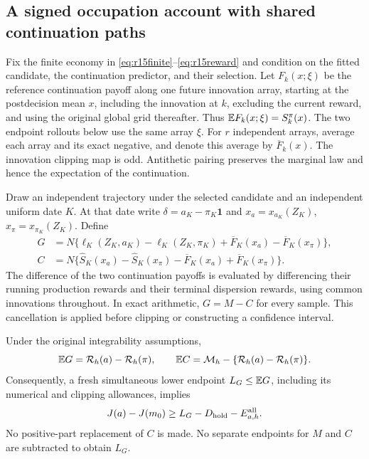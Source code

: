 \subsection{A signed occupation account with shared continuation paths}
\label{sec:r16signedbridge}

Fix the finite economy in \eqref{eq:r15finite}--\eqref{eq:r15reward} and
condition on the fitted candidate, the continuation predictor, and their
selection. Let $F_k(x;\xi)$ be the reference continuation payoff along one
future innovation array, starting at the postdecision mean $x$, including
the innovation at $k$, excluding the current reward, and using the original
global grid thereafter. Thus $\mathbb E F_k(x;\xi)=S_k^\pi(x)$. The two endpoint
rollouts below use the same array $\xi$. For $r$ independent arrays, average
each array and its exact negative, and denote this average by
$\overline F_k(x)$. The innovation clipping map is odd. Antithetic pairing
preserves the marginal law and hence the expectation of the continuation.

Draw an independent trajectory under the selected candidate and an independent
uniform date $K$. At that date write $\delta=a_K-\pi_K\bm1$ and
$x_a=x_{a_K}(Z_K)$, $x_\pi=x_{\pi_K}(Z_K)$. Define
\begin{align}
 G&=N\{\ell_K(Z_K,a_K)-\ell_K(Z_K,\pi_K)
                 +\overline F_K(x_a)-\overline F_K(x_\pi)\},\label{eq:r16signedG}\\
 C&=N\{\widehat S_K(x_a)-\widehat S_K(x_\pi)
                 -\overline F_K(x_a)+\overline F_K(x_\pi)\}.
 \label{eq:r16signedC}
\end{align}
The difference of the two continuation payoffs is evaluated by differencing
their running production rewards and their terminal dispersion rewards,
using common innovations throughout. In exact arithmetic, $G=M-C$ for every
sample. This cancellation is applied before clipping or constructing a
confidence interval.

\begin{proposition}
\label{prop:r16signedbridge}
Under the original integrability assumptions,
\[
 \mathbb E G=\mathcal R_h(a)-\mathcal R_h(\pi),\qquad
 \mathbb E C=\mathcal M_h-\{\mathcal R_h(a)-\mathcal R_h(\pi)\}.
\]
Consequently, a fresh simultaneous lower endpoint $L_G\leq\mathbb E G$, including
its numerical and clipping allowances, implies
\[
 J(a)-J(m_0)\geq L_G-D_{\rm hold}-E_{a,h}^{\rm all}.
\]
No positive-part replacement of $C$ is made. No separate endpoints for $M$
and $C$ are subtracted to obtain $L_G$.
\end{proposition}

